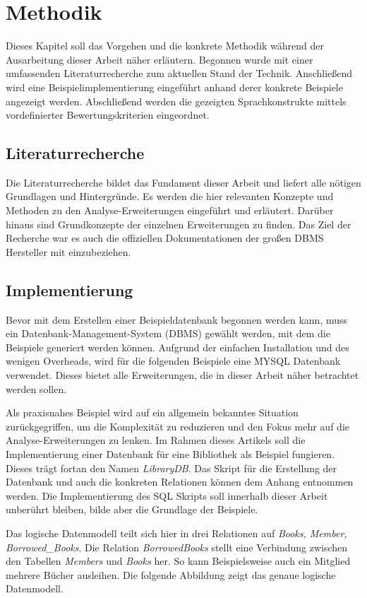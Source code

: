 \chapter{Methodik}
\label{chap:methodik} Dieses Kapitel soll das Vorgehen und die konkrete Methodik
während der Ausarbeitung dieser Arbeit näher erläutern. Begonnen wurde mit einer
umfassenden Literaturrecherche zum aktuellen Stand der Technik. Anschließend wird
eine Beispielimplementierung eingeführt anhand derer konkrete Beispiele angezeigt
werden. Abschließend werden die gezeigten Sprachkonstrukte mittels
vordefinierter Bewertungskriterien eingeordnet.

\section{Literaturrecherche}
Die Literaturrecherche bildet das Fundament dieser Arbeit und liefert alle
nötigen Grundlagen und Hintergründe. Es werden die hier relevanten Konzepte und Methoden
zu den Analyse-Erweiterungen eingeführt und erläutert. Darüber hinaus sind
Grundkonzepte der einzelnen Erweiterungen zu finden. Das Ziel der Recherche war es
auch die offiziellen Dokumentationen der großen DBMS Hersteller mit einzubeziehen.

\section{Implementierung}
Bevor mit dem Erstellen einer Beispieldatenbank begonnen werden kann, muss ein
Datenbank-Management-System (DBMS) gewählt werden, mit dem die Beispiele generiert
werden können. Aufgrund der einfachen Installation und des wenigen Overheads, wird
für die folgenden Beispiele eine MYSQL Datenbank verwendet. Dieses bietet alle
Erweiterungen, die in dieser Arbeit näher betrachtet werden sollen.

Als praxisnahes Beispiel wird auf ein allgemein bekanntes Situation zurückgegriffen,
um die Komplexität zu reduzieren und den Fokus mehr auf die Analyse-Erweiterungen
zu lenken. Im Rahmen dieses Artikels soll die Implementierung einer Datenbank für
eine Bibliothek als Beispiel fungieren. Dieses trägt fortan den Namen \textit{LibraryDB}.
Das Skript für die Erstellung der Datenbank und auch die konkreten Relationen
können dem Anhang entnommen werden. Die Implementierung des SQL Skripts soll innerhalb
dieser Arbeit unberührt bleiben, bilde aber die Grundlage der Beispiele.

Das logische Datenmodell teilt sich hier in drei Relationen auf \textit{Books, Member,
Borrowed\_Books}. Die Relation \textit{BorrowedBooks} stellt eine Verbindung zwischen
den Tabellen \textit{Members} und \textit{Books} her. So kann Beispielsweise
auch ein Mitglied mehrere Bücher ausleihen. Die folgende Abbildung zeigt das genaue
logische Datenmodell.

